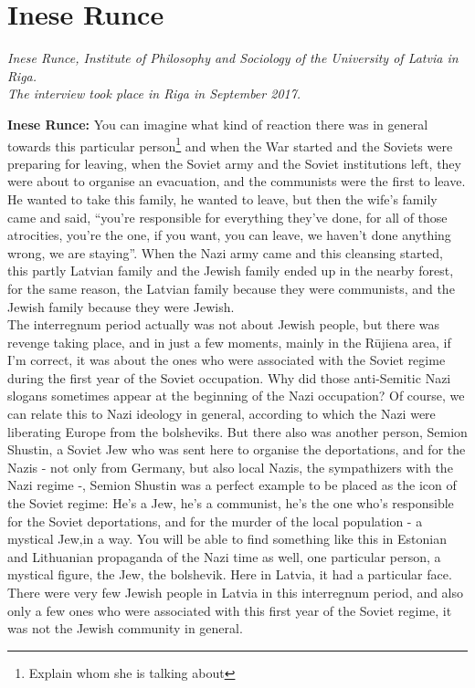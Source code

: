 \section{Inese Runce}

\textit{Inese Runce, Institute of Philosophy and Sociology of the University of Latvia in Riga.\\ 
The interview took place in Riga in September 2017.}\par
\vspace*{2em}
\textbf{Inese Runce:} You can imagine what kind of reaction there was in general towards this particular person\footnote{Explain whom she is talking about} and when the War started and the Soviets were preparing for leaving, when the Soviet army and the Soviet institutions left, they were about to organise an evacuation, and the communists were the first to leave.  He wanted to take this family, he wanted to leave, but then the wife's family came and said, ``you're responsible for everything they've done, for all of those atrocities, you're the one, if you want, you can leave, we haven't done anything wrong, we are staying''. When the Nazi army came and this cleansing started, this partly Latvian family and the Jewish family ended up in the nearby forest, for the same reason, the Latvian family because they were communists, and the Jewish family because they were Jewish.\\
The interregnum period actually was not about Jewish people, but there was revenge taking place, and in just a few moments, mainly in the Rūjiena area, if I'm correct, it was about the ones who were associated with the Soviet regime during the first year of the Soviet occupation. Why did those anti-Semitic Nazi slogans sometimes appear at the beginning of the Nazi occupation? Of course, we can relate this to Nazi ideology in general, according to which the Nazi were liberating Europe from the bolsheviks. But there also was another person, Semion Shustin, a Soviet Jew who was sent here to organise the  deportations, and for the Nazis - not only from Germany, but also local Nazis, the sympathizers with the Nazi regime -, Semion Shustin was a perfect example to be placed as the icon of the Soviet regime: He's a Jew, he's a communist, he's the one who's responsible for the Soviet deportations, and for the murder of the local population - a mystical Jew,in a way. You will be able to find something like this in Estonian and Lithuanian propaganda of the Nazi time as well, one particular person, a mystical figure, the Jew, the bolshevik. Here in Latvia, it had a particular face. There were very few Jewish people in Latvia in this interregnum period, and also only a few ones who were associated with this first year of the Soviet regime, it was not the Jewish community in general.
	
